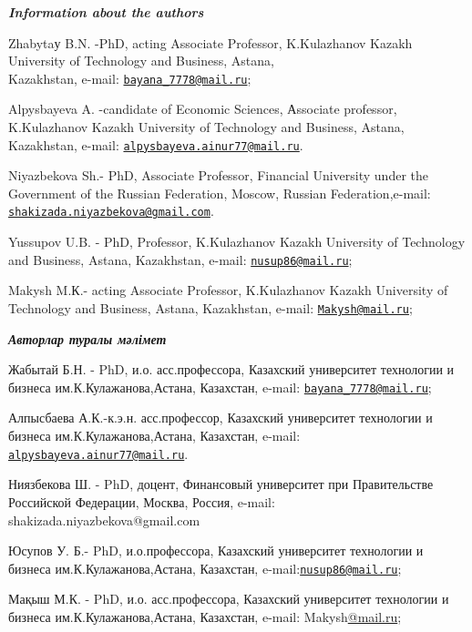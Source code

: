 \begin{authorinfo}
\emph{{\bfseries Information about the authors}}

Zhabytaу B.N. -PhD, acting Associate Professor, K.Kulazhanov Kazakh
University of Technology and Business, Astana, \\Kazakhstan, e-mail:
\href{mailto:bayana_7778@mail.ru}{\nolinkurl{bayana\_7778@mail.ru}};

Alpysbayeva A. -candidate of Economic Sciences, Аssociate professor,
K.Kulazhanov Kazakh University of Technology and Business, Astana,
Kazakhstan, e-mail:
\href{mailto:alpysbayeva.ainur77@mail.ru}{\nolinkurl{alpysbayeva.ainur77@mail.ru}}.

Niyazbekova Sh.- PhD, Associate Professor, Financial University under
the Government of the Russian Federation, Moscow, Russian
Federation,e-mail:
\href{mailto:shakizada.niyazbekova@gmail.com}{\nolinkurl{shakizada.niyazbekova@gmail.com}}.

Yussupov U.B. - PhD, Professor, K.Kulazhanov Kazakh University of
Technology and Business, Astana, Kazakhstan, e-mail:
\href{mailto:nusup86@mail.ru}{\nolinkurl{nusup86@mail.ru}};

Makysh M.К.- acting Associate Professor, K.Kulazhanov Kazakh University
of Technology and Business, Astana, Kazakhstan, e-mail:
\href{mailto:Makysh@mail.ru}{\nolinkurl{Makysh@mail.ru}};

\emph{{\bfseries Авторлар туралы мәлімет}}

Жабытай Б.Н. - PhD, и.о. асс.профессора, Казахский университет
технологии и бизнеса им.К.Кулажанова,Астана, Казахстан, e-mail:
\href{mailto:bayana_7778@mail.ru}{\nolinkurl{bayana\_7778@mail.ru}};

Алпысбаева А.К.-к.э.н. асс.профессор, Казахский университет технологии и
бизнеса им.К.Кулажанова,Астана, Казахстан, e-mail:
\href{mailto:alpysbayeva.ainur77@mail.ru}{\nolinkurl{alpysbayeva.ainur77@mail.ru}}.

Ниязбекова Ш. - PhD, доцент, Финансовый университет при Правительстве
Российской Федерации, Москва, Россия, e-mail:
shakizada.niyazbekova@gmail.com

Юсупов У. Б.- PhD, и.о.профессора, Казахский университет технологии и
бизнеса им.К.Кулажанова,Астана, Казахстан,
e-mail:\href{mailto:nusup86@mail.ru}{\nolinkurl{nusup86@mail.ru}};

Мақыш М.К. - PhD, и.о. асс.профессора, Казахский университет технологии
и бизнеса им.К.Кулажанова,Астана, Казахстан, e-mail:
Makysh\href{mailto:bayana_7778@mail.ru}{@mail.ru};
\end{authorinfo}
